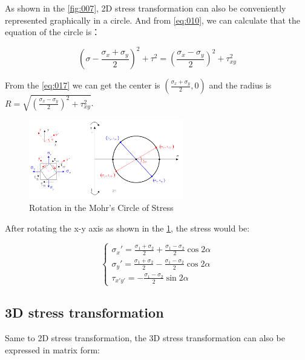 \documentclass[en,hazy,cyan,8pt,normal]{elegantnote}
\numberwithin{equation}{section}
\begin{document}
    As shown in the \cref{fig:007}, 2D stress transformation can also be conveniently represented graphically in a circle. And from \cref{eq:010}, we can calculate that the equation of the circle is：

    \begin{equation}\label{eq:017}
      \left( \sigma - \frac{\sigma_x + \sigma_y}{2} \right)^2 + \tau^2 = \left( \frac{\sigma_x - \sigma_y}{2} \right)^2 + \tau_{xy}^2
    \end{equation}

    From the \cref{eq:017} we can get the center is $\displaystyle \left(\frac{\sigma_x + \sigma_y}{2}, 0\right)$ and the radius is $\displaystyle R=\sqrt{\left( \frac{\sigma_x - \sigma_y}{2} \right)^2 + \tau_{xy}^2}$.

    \begin{figure}[H]
      \centering
      \includegraphics[width=0.6\textwidth]{image/008.png}
      \caption{Rotation in the Mohr's Circle of Stress}
      \label{fig:008}
    \end{figure}

    After rotating the x-y axis as shown in the \cref{fig:008}, the stress would be:

    \begin{equation}\label{eq:018}
      \begin{cases}
        \displaystyle \sigma_x'=\frac{\sigma_1+\sigma_2}{2}+\frac{\sigma_1-\sigma_2}{2}\cos2\alpha\\
        \displaystyle \sigma_y'=\frac{\sigma_1+\sigma_2}{2}-\frac{\sigma_1-\sigma_2}{2}\cos2\alpha\\
        \displaystyle \tau_{x'y'}=-\frac{\sigma_1-\sigma_2}{2}\sin2\alpha
      \end{cases}
    \end{equation}
  
  \subsection{3D stress transformation}
    Same to 2D stress transformation, the 3D stress transformation can also be expressed in matrix form:
\end{document}
